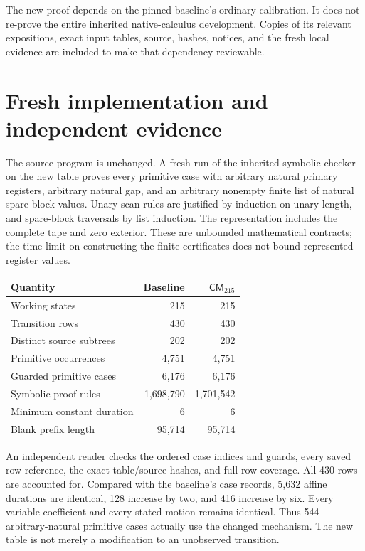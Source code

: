 \documentclass[11pt]{article}
\theoremstyle{definition}\newtheorem{definition}[theorem]{Definition}
\theoremstyle{remark}\newtheorem{remark}[theorem]{Remark}
\newcommand{\Knew}{\mathsf{CM}_{215}}
\begin{document}
The new proof depends on the pinned baseline's ordinary calibration.
It does not re-prove the entire inherited native-calculus development.
Copies of its relevant expositions, exact input tables, source, hashes,
notices, and the fresh local evidence are included to make that dependency
reviewable.

\section{Fresh implementation and independent evidence}
\label{sec:verification}

The source program is unchanged. A fresh run of the inherited symbolic
checker on the new table proves every primitive case with arbitrary natural
primary registers, arbitrary natural gap, and an arbitrary nonempty finite
list of natural spare-block values. Unary scan rules are justified by
induction on unary length, and spare-block traversals by list induction.
The representation includes the complete tape and zero exterior. These
are unbounded mathematical contracts; the time limit on constructing
the finite certificates does not bound represented register values.

\begin{center}
\begin{tabular}{lrr}
\toprule
Quantity & Baseline & $\Knew$ \\
\midrule
Working states & 215 & 215 \\
Transition rows & 430 & 430 \\
Distinct source subtrees & 202 & 202 \\
Primitive occurrences & 4,751 & 4,751 \\
Guarded primitive cases & 6,176 & 6,176 \\
Symbolic proof rules & 1,698,790 & 1,701,542 \\
Minimum constant duration & 6 & 6 \\
Blank prefix length & 95,714 & 95,714 \\
\bottomrule
\end{tabular}
\end{center}

An independent reader checks the ordered case indices and guards, every
saved row reference, the exact table/source hashes, and full row coverage.
All 430 rows are accounted for. Compared with the baseline's case records,
5,632 affine durations are identical, 128 increase by two, and 416 increase
by six. Every variable coefficient and every stated motion remains
identical. Thus 544 arbitrary-natural primitive cases actually use the
changed mechanism. The new table is not merely a modification to an
unobserved transition.
\end{document}
